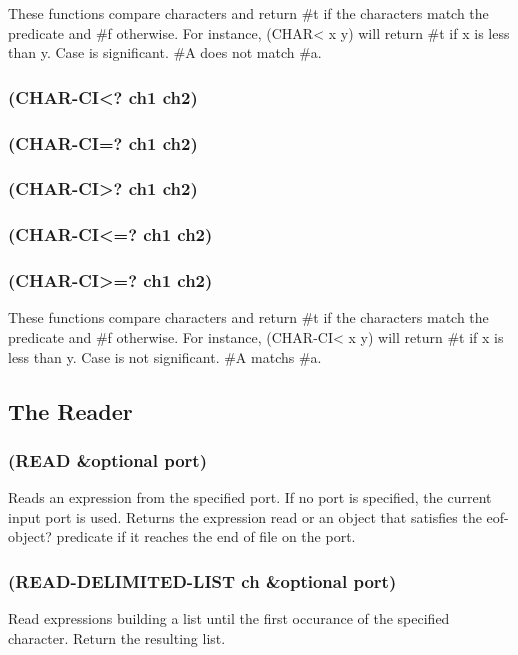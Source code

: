 \documentclass[11pt]{article}
\begin{document}
These functions compare characters and return \#t if the characters
match the predicate and \#f otherwise.  For instance, (CHAR< x y) will
return \#t if x is less than y.  Case is significant.  \#A does not
match \#a.
\subsubsection{(CHAR-CI<? ch1 ch2)}
\label{sec-4-31-7}
\subsubsection{(CHAR-CI=? ch1 ch2)}
\label{sec-4-31-8}
\subsubsection{(CHAR-CI>? ch1 ch2)}
\label{sec-4-31-9}
\subsubsection{(CHAR-CI<=? ch1 ch2)}
\label{sec-4-31-10}
\subsubsection{(CHAR-CI>=? ch1 ch2)}
\label{sec-4-31-11}

These functions compare characters and return \#t if the characters
match the predicate and \#f otherwise.  For instance, (CHAR-CI< x y)
will return \#t if x is less than y.  Case is not significant.  \#A
matchs \#a.
\subsection{The Reader}
\label{sec-4-32}

\subsubsection{(READ \&optional port)}
\label{sec-4-32-1}

Reads an expression from the specified port.  If no port is
specified, the current input port is used.  Returns the expression
read or an object that satisfies the eof-object? predicate if it
reaches the end of file on the port.
\subsubsection{(READ-DELIMITED-LIST ch \&optional port)}
\label{sec-4-32-2}

Read expressions building a list until the first occurance of the
specified character.  Return the resulting list.
\end{document}

